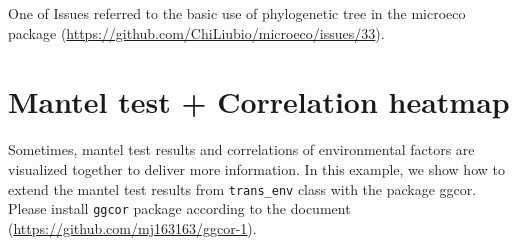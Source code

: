 \documentclass[
]{book}
\begin{document}
One of Issues referred to the basic use of phylogenetic tree in the microeco package (\url{https://github.com/ChiLiubio/microeco/issues/33}).

\hypertarget{mantel-test-correlation-heatmap}{%
\section{Mantel test + Correlation heatmap}\label{mantel-test-correlation-heatmap}}

Sometimes, mantel test results and correlations of environmental factors are visualized together to deliver more information.
In this example, we show how to extend the mantel test results from \texttt{trans\_env} class with the package ggcor.
Please install \texttt{ggcor} package according to the document (\url{https://github.com/mj163163/ggcor-1}).
\end{document}
